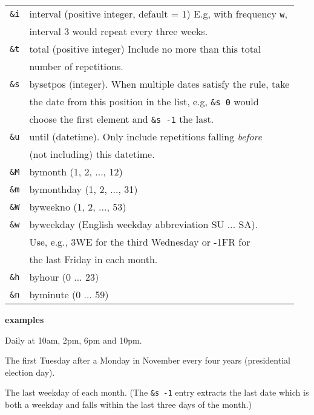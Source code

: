 \documentclass[10pt,landscape]{article}
\begin{document}
\begin{multicols}{3}
\begin{tabular}{@{}ll@{}}
\texttt{\&i} & interval (positive integer, default = 1) E.g, with frequency \verb!w!, \\
             & interval 3 would repeat every three weeks. \\
\texttt{\&t} & total (positive integer) Include no more than this total \\
             & number of repetitions. \\
\texttt{\&s} & bysetpos (integer). When multiple dates satisfy the rule, take \\
             & the date from this position in the list, e.g, \verb!&s 0! would\\
             & choose the first element and \verb!&s -1! the last. \\
\texttt{\&u} & until (datetime). Only include repetitions falling \emph{before} \\
             & (not including) this datetime. \\
\texttt{\&M} & bymonth (1, 2, ..., 12) \\
\texttt{\&m} & bymonthday (1, 2, ..., 31) \\
\texttt{\&W} & byweekno (1, 2, ..., 53) \\
\texttt{\&w} & byweekday (English weekday abbreviation SU ... SA). \\
             & Use, e.g., 3WE for the third Wednesday or -1FR for \\
             & the last Friday in each month. \\
\texttt{\&h} & byhour (0 ... 23) \\
\texttt{\&n} & byminute (0 ... 59) \\
\end{tabular}

\vskip 4pt
\textbf{examples}
\vskip 3pt

\begin{compactdesc}
  \item[\texttt{@r d \&h 10, 14 18, 22}:]
    Daily at 10am, 2pm, 6pm and 10pm.
  \item[\texttt{@r y \&i 4 \&M 11 \&m range(2,9) \&w TU}:]
    The first Tuesday after a Monday in November every four years (presidential election day).
  \item[\texttt{@r m \&w MO, TU, WE, TH, FR \&m -1, -2, -3 \&s -1}:]
    The last weekday of each month. (The \verb!&s -1! entry extracts the last date which is both a weekday and falls within the last three days of the month.)
\end{compactdesc}


\end{multicols}
\end{document}
